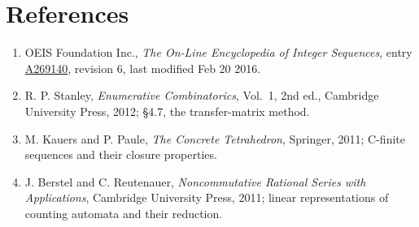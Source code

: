 \documentclass[11pt]{article}
\theoremstyle{definition}
\begin{document}
\section{References}

\begin{enumerate}

\item OEIS Foundation Inc., \emph{The On-Line Encyclopedia of Integer Sequences}, entry \href{https://oeis.org/A269140}{A269140}, revision 6, last modified Feb 20 2016.

\item R. P. Stanley, \emph{Enumerative Combinatorics}, Vol.~1, 2nd ed., Cambridge University Press, 2012; \S4.7, the transfer-matrix method.

\item M. Kauers and P. Paule, \emph{The Concrete Tetrahedron}, Springer, 2011; C-finite sequences and their closure properties.

\item J. Berstel and C. Reutenauer, \emph{Noncommutative Rational Series with Applications}, Cambridge University Press, 2011; linear representations of counting automata and their reduction.

\end{enumerate}
\end{document}
